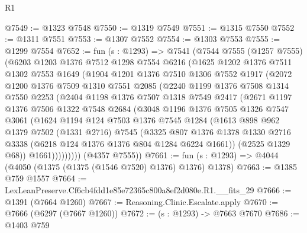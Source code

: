 \begin{lexlean}{R1}
\begin{coremodule}
@7549 := @1323 @7548
@7550 := @1319 @7549
@7551 := @1315 @7550
@7552 := @1311 @7551
@7553 := @1307 @7552
@7554 := @1303 @7553
@7555 := @1299 @7554
@7652 := fun (s : @1293) =>
  @7541
    (@7544
      @7555
      (@1257 @7555)
      (@6203
        @1203
        @1376
        @7512
        @1298
        @7554
        @6216
        (@1625
          @1202
          @1376
          @7511
          @1302
          @7553
          @1649
          (@1904
            @1201
            @1376
            @7510
            @1306
            @7552
            @1917
            (@2072
              @1200
              @1376
              @7509
              @1310
              @7551
              @2085
              (@2240
                @1199
                @1376
                @7508
                @1314
                @7550
                @2253
                (@2404
                  @1198
                  @1376
                  @7507
                  @1318
                  @7549
                  @2417
                  (@2671
                    @1197
                    @1376
                    @7506
                    @1322
                    @7548
                    @2684
                    (@3048
                      @1196
                      @1376
                      @7505
                      @1326
                      @7547
                      @3061
                      (@1624
                        @1194
                        @124
                        @7503
                        @1376
                        @7545
                        @1284
                        (@1613
                          @898
                          @962
                          @1379
                          @7502
                          (@1331 @2716)
                          @7545
                          (@3325
                            @807
                            @1376
                            @1378
                            @1330
                            @2716
                            @3338
                            (@6218 @124 @1376 @1376 @804 @1284 @6224 @1661))
                          (@2525 @1329 @68))
                        @1661)))))))))
      (@4357 @7555))
@7661 := fun (s : @1293) => @4044 (@4050 (@1375 (@1375 (@1546 @7520) @1376) @1376) @1378)
@7663 := @1385 @759 @1557
@7664 := LexLeanPreserve.Cf6cb4fdd1e85e72365c800a8ef2d080e.R1.__fits_29
@7666 := @1391 (@7664 @1260)
@7667 := Reasoning.Clinic.Escalate.apply
@7670 := @7666 (@6297 (@7667 @1260))
@7672 := (s : @1293) -> @7663 @7670
@7686 := @1403
    @759

\end{coremodule}
\end{lexlean}
